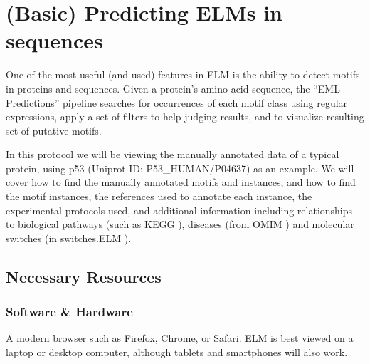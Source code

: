\section{(Basic) Predicting ELMs in sequences}
\label{sec:predicting_p53}

One of the most useful (and used) features in ELM is the ability to
detect motifs in proteins and sequences. Given a protein's amino acid
sequence, the ``EML Predictions'' pipeline searches for occurrences of
each motif class using regular expressions, apply a set of filters to
help judging results, and to visualize resulting set of putative motifs.

In this protocol we will be viewing the manually annotated data of a
typical protein, using p53 (Uniprot ID: P53\_HUMAN/P04637) as an
example. We will cover how to find the manually annotated motifs and
instances, and how to find the motif instances, the references used to
annotate each instance, the experimental protocols used, and additional
information including relationships to biological pathways (such as KEGG
\cite{26476454}), diseases (from OMIM \cite{17357067}) and molecular
switches (in switches.ELM \cite{23550212}).

%
%

\subsection{Necessary Resources}\label{necessary-resources}

\subsubsection{Software \& Hardware}\label{software-hardware}

A modern browser such as Firefox, Chrome, or Safari. ELM is best viewed
on a laptop or desktop computer, although tablets and smartphones will
also work.

